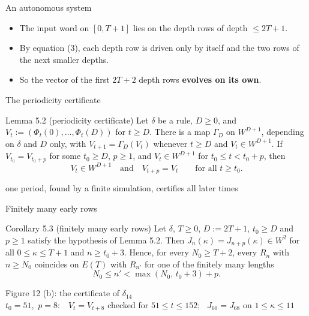 \begin{frame}{An autonomous system}
\vspace{3ex}
\begin{itemize}
\item The input word on $[0,T+1]$ lies on the depth rows of depth $\le 2T+1$.
\item By equation (3), each depth row is driven only by itself and the two rows of the next smaller depths.
\item So the vector of the first $2T+2$ depth rows \textbf{evolves on its own}.
\end{itemize}
\end{frame}

\begin{frame}{The periodicity certificate}
\begin{statement}{Lemma 5.2 (periodicity certificate)}
Let $\delta$ be a rule, $D\ge0$, and $V_t:=(\Phi_t(0),\dots,\Phi_t(D))$ for $t\ge D$. There is a map $\Gamma_D$ on $W^{D+1}$, depending on $\delta$ and $D$ only, with $V_{t+1}=\Gamma_D(V_t)$ whenever $t\ge D$ and $V_t\in W^{D+1}$. If $V_{t_0}=V_{t_0+p}$ for some $t_0\ge D$, $p\ge1$, and $V_t\in W^{D+1}$ for $t_0\le t<t_0+p$, then
\[V_t\in W^{D+1}\quad\text{and}\quad V_{t+p}=V_t\qquad\text{for all }t\ge t_0 .\]
\end{statement}
\begin{center}one period, found by a finite simulation, certifies all later times\end{center}
\end{frame}

\begin{frame}{Finitely many early rows}
\begin{statement}{Corollary 5.3 (finitely many early rows)}
Let $\delta$, $T\ge0$, $D:=2T+1$, $t_0\ge D$ and $p\ge1$ satisfy the hypothesis of Lemma 5.2. Then $J_n(\kappa)=J_{n+p}(\kappa)\in W^2$ for all $0\le\kappa\le T+1$ and $n\ge t_0+3$. Hence, for every $N_0\ge T+2$, every $R_n$ with $n\ge N_0$ coincides on $E(T)$ with $R_{n'}$ for one of the finitely many lengths
\[N_0\le n'<\max(N_0,\,t_0+3)+p .\]
\end{statement}
\end{frame}

\begin{frame}{Figure 12 (b): the certificate of $\delta_{14}$}
\centering\fig[0.72]{}\\[0.5ex]
\small $t_0=51$,\ $p=8$:\ \ $V_t=V_{t+8}$ checked for $51\le t\le152$; \ $J_{60}=J_{68}$ on $1\le\kappa\le11$
\end{frame}

